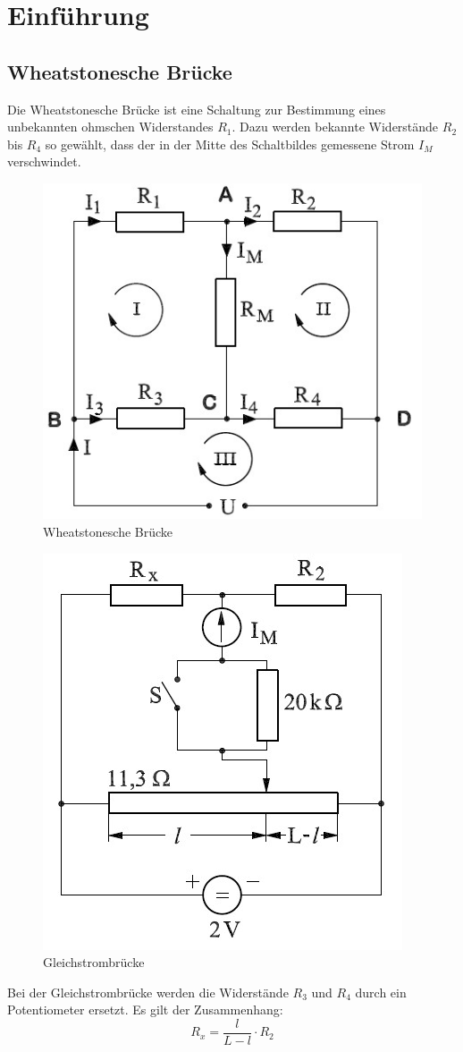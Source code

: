 \section{Einführung}
\subsection{Wheatstonesche Brücke}
Die Wheatstonesche Brücke ist eine Schaltung zur Bestimmung eines unbekannten ohmschen Widerstandes $R_1$. Dazu werden bekannte Widerstände $R_2$ bis $R_4$ so gewählt, dass der in der Mitte des Schaltbildes gemessene Strom $I_M$ verschwindet. 
\begin{figure}[h]
  \centering
  \includegraphics[width=.5\textwidth]{wheat1.jpg}
  \caption{Wheatstonesche Brücke}
  \label{fig:wheat1}
\end{figure}
\begin{figure}[h]
  \centering
  \includegraphics[width=.5\textwidth]{wheatgleich.jpg}
  \caption{Gleichstrombrücke}
  \label{fig:wheatgleich}
\end{figure}
Bei der Gleichstrombrücke werden die Widerstände $R_3$ und $R_4$ durch ein Potentiometer ersetzt.
Es gilt der Zusammenhang:
\begin{equation}
  R_x=\frac{l}{L-l}\cdot R_2
  \label{eq:wheat1}
\end{equation}
